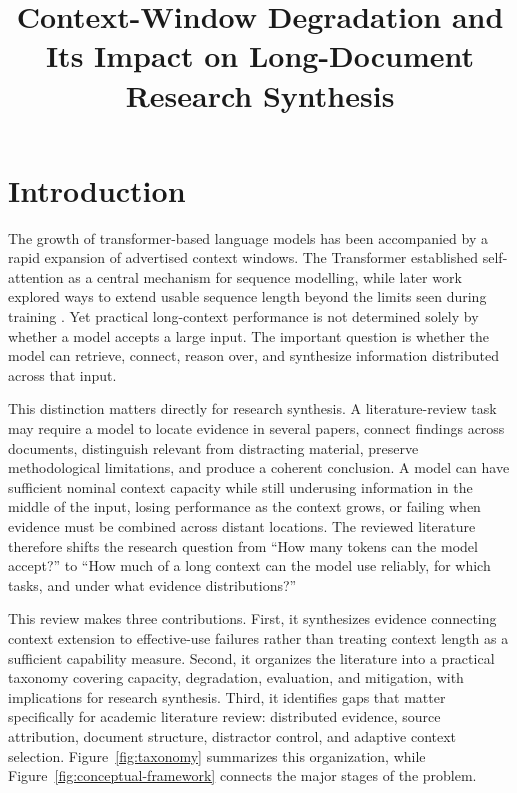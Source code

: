 \documentclass[manuscript,screen,oneside]{acmart}
\title{Context-Window Degradation and Its Impact on Long-Document Research Synthesis}
\begin{document}
\setlength{\evensidemargin}{\oddsidemargin}
\setlength{\textwidth}{\dimexpr\paperwidth-1in-\oddsidemargin-\hoffset-\oddsidemargin-\hoffset\relax}
\renewcommand{\normalsize}{\fontsize{12pt}{15pt}\selectfont}
\renewcommand{\small}{\fontsize{11pt}{13.5pt}\selectfont}
\renewcommand{\footnotesize}{\fontsize{10.5pt}{13pt}\selectfont}
\maketitle
\pagestyle{empty}
\thispagestyle{empty}

\section{Introduction}\label{sec:introduction}
The growth of transformer-based language models has been accompanied by a rapid expansion of advertised context windows. The Transformer established self-attention as a central mechanism for sequence modelling, while later work explored ways to extend usable sequence length beyond the limits seen during training \cite{vaswani2017attention}. Yet practical long-context performance is not determined solely by whether a model accepts a large input. The important question is whether the model can retrieve, connect, reason over, and synthesize information distributed across that input.

This distinction matters directly for research synthesis. A literature-review task may require a model to locate evidence in several papers, connect findings across documents, distinguish relevant from distracting material, preserve methodological limitations, and produce a coherent conclusion. A model can have sufficient nominal context capacity while still underusing information in the middle of the input, losing performance as the context grows, or failing when evidence must be combined across distant locations. The reviewed literature therefore shifts the research question from ``How many tokens can the model accept?'' to ``How much of a long context can the model use reliably, for which tasks, and under what evidence distributions?''

This review makes three contributions. First, it synthesizes evidence connecting context extension to effective-use failures rather than treating context length as a sufficient capability measure. Second, it organizes the literature into a practical taxonomy covering capacity, degradation, evaluation, and mitigation, with implications for research synthesis. Third, it identifies gaps that matter specifically for academic literature review: distributed evidence, source attribution, document structure, distractor control, and adaptive context selection. Figure~\ref{fig:taxonomy} summarizes this organization, while Figure~\ref{fig:conceptual-framework} connects the major stages of the problem.
\end{document}
